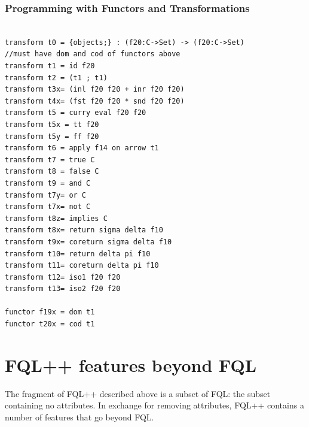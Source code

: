 \documentclass[12pt]{article}
\begin{document}
\subsubsection{Programming with Functors and Transformations}

\begin{verbatim}

transform t0 = {objects;} : (f20:C->Set) -> (f20:C->Set) 
//must have dom and cod of functors above 
transform t1 = id f20
transform t2 = (t1 ; t1) 
transform t3x= (inl f20 f20 + inr f20 f20) 
transform t4x= (fst f20 f20 * snd f20 f20) 
transform t5 = curry eval f20 f20
transform t5x = tt f20
transform t5y = ff f20
transform t6 = apply f14 on arrow t1
transform t7 = true C
transform t8 = false C
transform t9 = and C
transform t7y= or C
transform t7x= not C
transform t8z= implies C
transform t8x= return sigma delta f10
transform t9x= coreturn sigma delta f10
transform t10= return delta pi f10
transform t11= coreturn delta pi f10
transform t12= iso1 f20 f20
transform t13= iso2 f20 f20

functor f19x = dom t1
functor t20x = cod t1
\end{verbatim}
 \newpage
 \section{FQL++ features beyond FQL}
 
The fragment of FQL++ described above is a subset of FQL: the subset containing no attributes.  In exchange for removing attributes, FQL++ contains a number of features that go beyond FQL.
\end{document}
